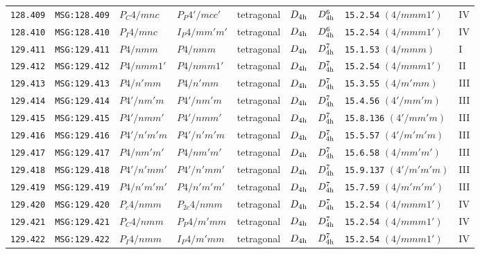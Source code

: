 \documentclass[fleqn,10pt]{jsarticle}
\begin{document}
\begin{center}
\begin{longtable}{lllllllll}
\texttt{128.409} & \texttt{MSG:128.409} & $P_{C}4/mnc$ & $P_{P}4'/mcc'$ & tetragonal & $D_{\rm 4h}$ & $D_{\rm 4h}^{6}$ & \texttt{15.2.54} $(4/mmm1')$ & IV \\
\texttt{128.410} & \texttt{MSG:128.410} & $P_{I}4/mnc$ & $I_{P}4/mm'm'$ & tetragonal & $D_{\rm 4h}$ & $D_{\rm 4h}^{6}$ & \texttt{15.2.54} $(4/mmm1')$ & IV \\ \hline
\texttt{129.411} & \texttt{MSG:129.411} & $P4/nmm$ & $P4/nmm$ & tetragonal & $D_{\rm 4h}$ & $D_{\rm 4h}^{7}$ & \texttt{15.1.53} $(4/mmm)$ & I \\
\texttt{129.412} & \texttt{MSG:129.412} & $P4/nmm1'$ & $P4/nmm1'$ & tetragonal & $D_{\rm 4h}$ & $D_{\rm 4h}^{7}$ & \texttt{15.2.54} $(4/mmm1')$ & II \\
\texttt{129.413} & \texttt{MSG:129.413} & $P4/n'mm$ & $P4/n'mm$ & tetragonal & $D_{\rm 4h}$ & $D_{\rm 4h}^{7}$ & \texttt{15.3.55} $(4/m'mm)$ & III \\
\texttt{129.414} & \texttt{MSG:129.414} & $P4'/nm'm$ & $P4'/nm'm$ & tetragonal & $D_{\rm 4h}$ & $D_{\rm 4h}^{7}$ & \texttt{15.4.56} $(4'/mm'm)$ & III \\
\texttt{129.415} & \texttt{MSG:129.415} & $P4'/nmm'$ & $P4'/nmm'$ & tetragonal & $D_{\rm 4h}$ & $D_{\rm 4h}^{7}$ & \texttt{15.8.136} $(4'/mm'm)$ & III \\
\texttt{129.416} & \texttt{MSG:129.416} & $P4'/n'm'm$ & $P4'/n'm'm$ & tetragonal & $D_{\rm 4h}$ & $D_{\rm 4h}^{7}$ & \texttt{15.5.57} $(4'/m'm'm)$ & III \\
\texttt{129.417} & \texttt{MSG:129.417} & $P4/nm'm'$ & $P4/nm'm'$ & tetragonal & $D_{\rm 4h}$ & $D_{\rm 4h}^{7}$ & \texttt{15.6.58} $(4/mm'm')$ & III \\
\texttt{129.418} & \texttt{MSG:129.418} & $P4'/n'mm'$ & $P4'/n'mm'$ & tetragonal & $D_{\rm 4h}$ & $D_{\rm 4h}^{7}$ & \texttt{15.9.137} $(4'/m'm'm)$ & III \\
\texttt{129.419} & \texttt{MSG:129.419} & $P4/n'm'm'$ & $P4/n'm'm'$ & tetragonal & $D_{\rm 4h}$ & $D_{\rm 4h}^{7}$ & \texttt{15.7.59} $(4/m'm'm')$ & III \\
\texttt{129.420} & \texttt{MSG:129.420} & $P_{c}4/nmm$ & $P_{2c}4/nmm$ & tetragonal & $D_{\rm 4h}$ & $D_{\rm 4h}^{7}$ & \texttt{15.2.54} $(4/mmm1')$ & IV \\
\texttt{129.421} & \texttt{MSG:129.421} & $P_{C}4/nmm$ & $P_{P}4/m'mm$ & tetragonal & $D_{\rm 4h}$ & $D_{\rm 4h}^{7}$ & \texttt{15.2.54} $(4/mmm1')$ & IV \\
\texttt{129.422} & \texttt{MSG:129.422} & $P_{I}4/nmm$ & $I_{P}4/m'mm$ & tetragonal & $D_{\rm 4h}$ & $D_{\rm 4h}^{7}$ & \texttt{15.2.54} $(4/mmm1')$ & IV \\ \hline

\end{longtable}
\end{center}
\end{document}
